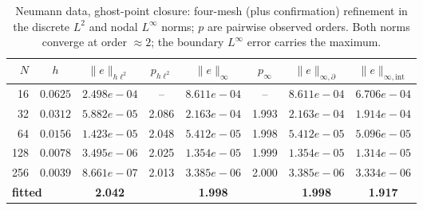 \begin{table}[H]
\centering\small
\caption{Neumann data, ghost-point closure: four-mesh (plus confirmation) refinement in the discrete $L^2$ and nodal $L^\infty$ norms; $p$ are pairwise observed orders.  Both norms converge at order $\approx 2$; the boundary $L^\infty$ error carries the maximum.}
\label{tab:conv-ghost-neu}
\begin{tabular}{rccccccc}
\toprule
$N$ & $h$ & $\lVert e\rVert_{h\ell^2}$ & $p_{h\ell^2}$ & $\lVert e\rVert_{\infty}$ & $p_{\infty}$ & $\lVert e\rVert_{\infty,\partial}$ & $\lVert e\rVert_{\infty,\mathrm{int}}$ \\
\midrule
16 & $0.0625$ & $2.498e-04$ & -- & $8.611e-04$ & -- & $8.611e-04$ & $6.706e-04$ \\
32 & $0.0312$ & $5.882e-05$ & 2.086 & $2.163e-04$ & 1.993 & $2.163e-04$ & $1.914e-04$ \\
64 & $0.0156$ & $1.423e-05$ & 2.048 & $5.412e-05$ & 1.998 & $5.412e-05$ & $5.096e-05$ \\
128 & $0.0078$ & $3.495e-06$ & 2.025 & $1.354e-05$ & 1.999 & $1.354e-05$ & $1.314e-05$ \\
256 & $0.0039$ & $8.661e-07$ & 2.013 & $3.385e-06$ & 2.000 & $3.385e-06$ & $3.334e-06$ \\
\midrule
\multicolumn{2}{l}{\textbf{fitted}} & \textbf{2.042} & & \textbf{1.998} & & \textbf{1.998} & \textbf{1.917} \\
\bottomrule
\end{tabular}
\end{table}